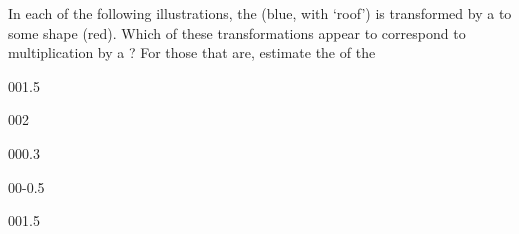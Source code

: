 \begin{exercise}  
In each of the following illustrations, the  (blue, with `roof') is transformed by a  to some shape (red).
Which of these transformations appear to correspond to multiplication by a ?  
For those that are, estimate the  of the 
\begin{Parts}
\item {}

\begin{OmitV1}
\item {}00{1.5}

\item {}00{2}
\end{OmitV1}

\item {}00{0.3}

\item {}

\begin{OmitV1}
\item {}

\item {}00{-0.5}
\end{OmitV1}

\item {}

\item {}00{1.5}

\item {}

\end{Parts}
\end{exercise}



